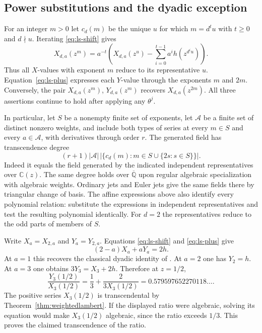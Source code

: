 \documentclass[11pt,a4paper]{article}
\theoremstyle{definition}
\theoremstyle{remark}
\numberwithin{equation}{section}
\begin{document}
\subsection{Power substitutions and the dyadic exception}
For an integer $m>0$ let $c_d(m)$ be the unique $u$ for which
$m=d^t u$ with $t\ge0$ and $d\nmid u$. Iterating
\eqref{eq:ls-shift} gives
\[
 X_{d,a}(z^m)=a^{-t}\left(
 X_{d,a}(z^u)-\sum_{i=0}^{t-1}a^i h(z^{d^i u})\right).
\]
Thus all $X$-values with exponent $m$ reduce to its representative
$u$. Equation~\eqref{eq:ls-plus} expresses each $Y$-value through
the exponents $m$ and $2m$. Conversely, the pair $X_{d,a}(z^m)$,
$Y_{d,a}(z^m)$ recovers $X_{d,a}(z^{2m})$. All three assertions
continue to hold after applying any $\theta^j$.

In particular, let $S$ be a nonempty finite set of exponents, let
$\mathcal A$ be a finite set of distinct nonzero weights, and include
both types of series at every $m\in S$ and every $a\in\mathcal A$,
with derivatives through order $r$. The generated field has
transcendence degree
\[
  (r+1)|\mathcal A|\,
  \bigl|\{c_d(m):m\in S\cup\{2s:s\in S\}\}\bigr|.
\]
Indeed it equals the field generated by the indicated independent
representatives over $\mathbb C(z)$. The same degree holds over
$\overline{\mathbb Q}$ upon regular algebraic specialization with
algebraic weights. Ordinary jets and Euler jets give the same fields
there by triangular change of basis. The affine expressions above
also identify every polynomial relation: substitute the expressions
in independent representatives and test the resulting polynomial
identically. For $d=2$ the representatives reduce to the odd parts of
members of $S$.

Write $X_a=X_{2,a}$ and $Y_a=Y_{2,a}$. Equations
\eqref{eq:ls-shift} and \eqref{eq:ls-plus} give
\[
              (2-a)X_a+aY_a=2h.
\]
At $a=1$ this recovers the classical dyadic identity of
\cite[equation (1.6)]{sn-lambert}. At $a=2$ one has $Y_2=h$.
At $a=3$ one obtains $3Y_3=X_3+2h$. Therefore at $z=1/2$,
\[
 \frac{Y_3(1/2)}{X_3(1/2)}
   =\frac13+\frac{2}{3X_3(1/2)}
   =0.579597652270118\ldots .
\]
The positive series $X_3(1/2)$ is transcendental by
Theorem~\ref{thm:weightedlambert}. If the displayed ratio were
algebraic, solving its equation would make $X_3(1/2)$ algebraic,
since the ratio exceeds $1/3$. This proves the claimed transcendence
of the ratio.
\end{document}
